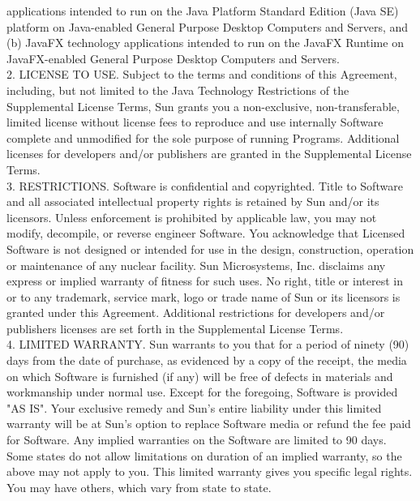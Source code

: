 {   applications intended to run on the Java Platform Standard Edition
   (Java SE) platform on Java-enabled General Purpose Desktop
   Computers and Servers, and (b) JavaFX technology applications
   intended to run on the JavaFX Runtime on JavaFX-enabled General
   Purpose Desktop Computers and Servers.
\\[4pt]
   2. LICENSE TO USE. Subject to the terms and conditions of this
   Agreement, including, but not limited to the Java Technology
   Restrictions of the Supplemental License Terms, Sun grants you a
   non-exclusive, non-transferable, limited license without license
   fees to reproduce and use internally Software complete and
   unmodified for the sole purpose of running Programs. Additional
   licenses for developers and/or publishers are granted in the
   Supplemental License Terms.
\\[4pt]
   3. RESTRICTIONS. Software is confidential and copyrighted. Title to
   Software and all associated intellectual property rights is
   retained by Sun and/or its licensors. Unless enforcement is
   prohibited by applicable law, you may not modify, decompile, or
   reverse engineer Software. You acknowledge that Licensed Software
   is not designed or intended for use in the design, construction,
   operation or maintenance of any nuclear facility. Sun Microsystems,
   Inc. disclaims any express or implied warranty of fitness for such
   uses. No right, title or interest in or to any trademark, service
   mark, logo or trade name of Sun or its licensors is granted under
   this Agreement. Additional restrictions for developers and/or
   publishers licenses are set forth in the Supplemental License
   Terms.
\\[4pt]
   4. LIMITED WARRANTY. Sun warrants to you that for a period of
   ninety (90) days from the date of purchase, as evidenced by a copy
   of the receipt, the media on which Software is furnished (if any)
   will be free of defects in materials and workmanship under normal
   use. Except for the foregoing, Software is provided "AS IS". Your
   exclusive remedy and Sun's entire liability under this limited
   warranty will be at Sun's option to replace Software media or
   refund the fee paid for Software. Any implied warranties on the
   Software are limited to 90 days. Some states do not allow
   limitations on duration of an implied warranty, so the above may
   not apply to you. This limited warranty gives you specific legal
   rights. You may have others, which vary from state to state.
\\[4pt]
}
